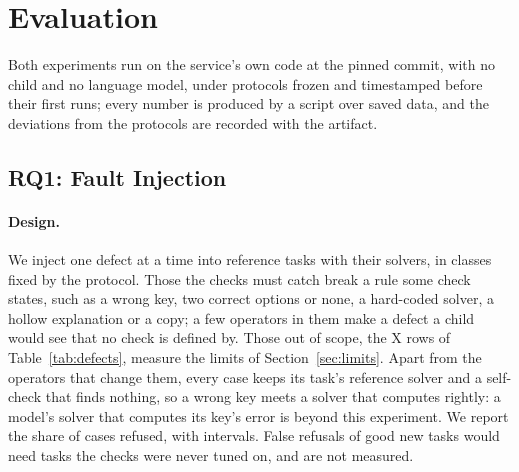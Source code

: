 \section{Evaluation}
\label{sec:evaluation}

Both experiments run on the service's own code at the pinned commit, with no child and no language model, under protocols frozen and timestamped before their first runs; every number is produced by a script over saved data, and the deviations from the protocols are recorded with the artifact.

\subsection{RQ1: Fault Injection}
\label{sec:rq1}

\paragraph{Design.} We inject one defect at a time into reference tasks with their solvers, in classes fixed by the protocol. Those the checks must catch break a rule some check states, such as a wrong key, two correct options or none, a hard-coded solver, a hollow explanation or a copy; a few operators in them make a defect a child would see that no check is defined by. Those out of scope, the X rows of Table~\ref{tab:defects}, measure the limits of Section~\ref{sec:limits}. Apart from the operators that change them, every case keeps its task's reference solver and a self-check that finds nothing, so a wrong key meets a solver that computes rightly: a model's solver that computes its key's error is beyond this experiment. We report the share of cases refused, with \pct{} intervals. False refusals of good new tasks would need tasks the checks were never tuned on, and are not measured.

